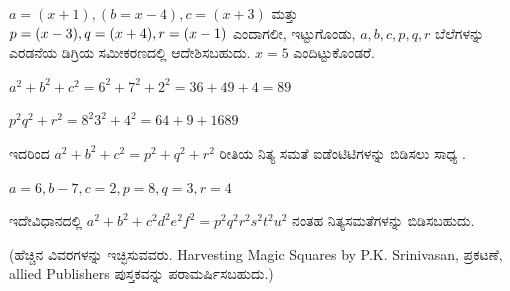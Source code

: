 $a=(x+1), (b=x-4), c=(x+3)$ ಮತ್ತು $p=(x-3),\break q=(x+4), r=(x-1)$ ಎಂದಾಗಲೀ, ಇಟ್ಟುಗೊಂಡು, $a, b, c, p, q, r$ ಬೆಲೆ\-ಗಳನ್ನು ಎರಡನೆಯ ಡಿಗ್ರಿಯ ಸಮೀಕರಣದಲ್ಲಿ ಆದೇಶಿಸಬಹುದು. $x=5$ ಎಂದಿಟ್ಟು\-ಕೊಂಡರೆ.

\newpage

$a^2 +b^2+c^2= 6^2 + 7^2 + 2^2 = 36 +49 +4=89$

\vskip 2pt

$p^2 q^2 + r^2 = 8^2 3^2 +4^2 = 64 +9 + 16 89$

\vskip 2pt

ಇದರಿಂದ $a^2+b^2+c^2 = p^2+q^2+r^2$ ರೀತಿಯ ನಿತ್ಯ ಸಮತೆ ಐಡೆಂಟಿಟಿಗಳನ್ನು ಬಿಡಿಸಲು ಸಾಧ್ಯ .

\vskip 2pt

$a=6, b-7, c=2, p=8, q=3, r=4$

\vskip 2pt

ಇದೇವಿಧಾನದಲ್ಲಿ $a^2 +b^2 +c^2 d^2 e^2 f^2 = p^2 q^2 r^2 s^2 t^2 u^2$ ನಂತಹ ನಿತ್ಯ\-ಸಮತೆಗಳನ್ನು ಬಿಡಿಸಬಹುದು.

\vskip 2pt

(ಹೆಚ್ಚಿನ ವಿವರಗಳನ್ನು ಇಚ್ಛಿಸುವವರು. Harvesting Magic Squares by P.K. Srinivasan, ಪ್ರಕಟಣೆ, allied Publishers ಪುಸ್ತಕವನ್ನು ಪರಾಮರ್ಷಿಸಬಹುದು.)
